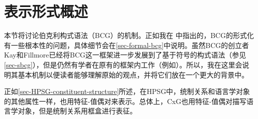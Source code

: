
\section{表示形式概述}

本节将讨论伯克利构式语法（BCG）的机制。正如我在 中指出的，BCG的形式化有一些根本性的问题，具体细节会在\ref{sec-formal-bcg}中说明。虽然BCG的创立者Kay和Fillmore已经将BCG这一框架进一步发展到了基于符号的构式语法（参见\ref{sec-sbcg}），但是仍然有学者在原有的框架内工作（例如\citet{Fried2013a-u}）。所以，我在这里会说明其基本机制以便读者能够理解原始的观点，并将它们放在一个更大的背景中。

正如\ref{sec-HPSG-constituent-structure}所述，在HPSG中，统制关系和语言学对象的其他属性一样，也用特征-值偶对来表示。总体上，CxG也用特征-值偶对描写语言学对象，但是统制关系用框盒进行表征\citep{KF99a,Goldberg2003a}。

